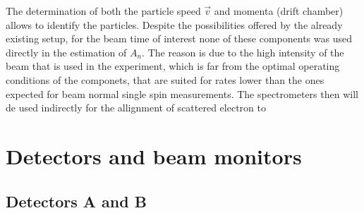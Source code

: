 The determination of both the particle speed $\vec{v}$ and momenta (drift chamber) allows to identify the particles. Despite the possibilities offered by the already existing setup, for the beam time of interest none of these components was used directly in the estimation of $A_{n}$. The reason is due to the high intensity of the beam that is used in the experiment, which is far from the optimal operating conditions of the componets, that are suited for rates lower than the ones expected for beam normal single spin measurements. The spectrometers then will de used indirectly for the allignment of scattered electron to

\section{Detectors and beam monitors}

\subsection{Detectors A and B}


